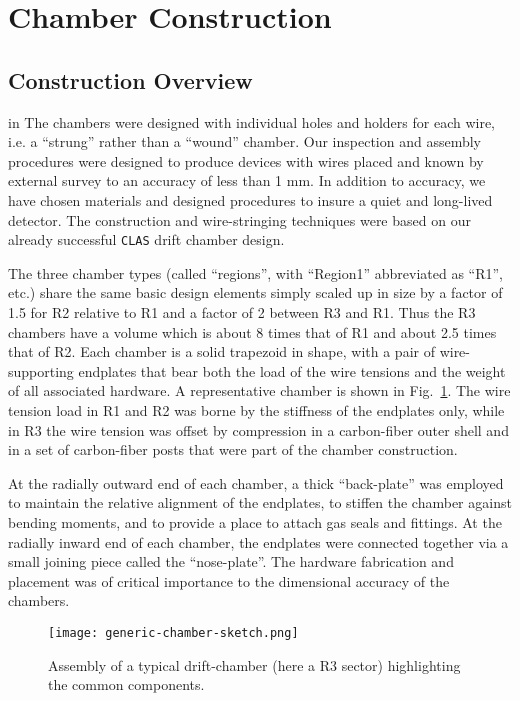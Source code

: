 \section{Chamber Construction}

\subsection{Construction Overview}

 in
The chambers were designed with individual holes and holders for
each wire, i.e. a ``strung'' rather than a ``wound'' chamber.  Our 
inspection and assembly procedures were designed to produce devices with 
wires placed and known by external survey to an accuracy of less than 1 mm. 
In addition to accuracy, we have chosen materials and designed 
procedures to insure a quiet and long-lived detector.  The construction 
and wire-stringing techniques were based on our already successful {\tt CLAS} 
drift chamber design.

The three chamber types (called ``regions'', with ``Region1'' abbreviated as 
``R1'', etc.)  share the same basic design elements simply
scaled up in size by a factor of 1.5 for R2 relative to R1 and a factor
of 2 between R3 and R1.  Thus the R3 chambers have a volume which is
about 8 times that of R1 and about 2.5 times that of R2.  
Each chamber is a solid trapezoid in shape, with  
a pair of wire-supporting endplates that bear both the load of the 
wire tensions and the weight of all associated hardware. A representative 
chamber is shown in Fig.~\ref{generic-chamber-sketch}.  The wire tension load in
R1 and R2 was borne by the stiffness of the endplates only, while in
R3 the wire tension was offset 
by compression in a carbon-fiber outer shell and in a set of carbon-fiber 
posts that were part of the chamber construction.  

At the radially outward end of each chamber, a thick ``back-plate'' was 
employed to maintain the relative 
alignment of the endplates, to stiffen the chamber against bending moments, 
and to provide a place to attach gas seals and fittings. At the radially inward 
end of each chamber, the endplates were connected together via a small joining 
piece called the ``nose-plate''.  The hardware fabrication and placement 
was of critical importance to the dimensional accuracy of the chambers.

\begin{figure}[htpb]   
\vspace{4.5cm}
\texttt{[image: generic-chamber-sketch.png]}
\caption{\small{Assembly of a typical drift-chamber
(here a R3 sector) highlighting the common components.}}
\label{generic-chamber-sketch}
\end{figure}   

